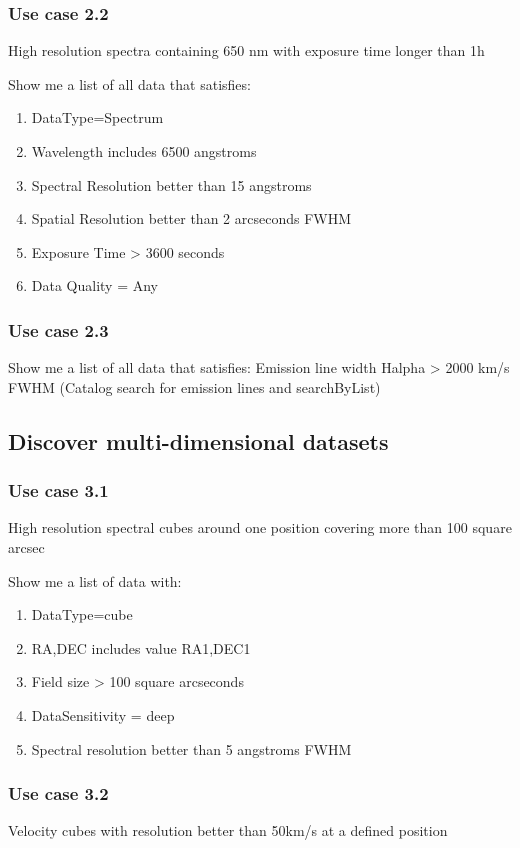 \documentclass[11pt,a4paper]{ivoa}
\begin{document}
\subsubsection{Use case 2.2}
High resolution spectra containing 650 nm with exposure time longer than 1h

Show me a list of all data that satisfies:

\begin{enumerate}
\item DataType=Spectrum
\item Wavelength includes 6500 angstroms
\item Spectral Resolution better than 15 angstroms
\item Spatial Resolution better than 2 arcseconds FWHM
\item Exposure Time {\textgreater} 3600 seconds
\item Data Quality = Any
\end{enumerate}
\subsubsection{Use case 2.3}
Show me a list of all data that satisfies: Emission line width Halpha {\textgreater} 2000 km/s FWHM (Catalog search for
emission lines and searchByList)

\subsection{Discover multi-dimensional datasets}
\subsubsection{Use case 3.1}
High resolution spectral cubes around one position covering more than 100 square arcsec

Show me a list of data with:

\begin{enumerate}
\item DataType=cube 
\item RA,DEC includes value RA1,DEC1
\item Field size {\textgreater} 100 square arcseconds
\item DataSensitivity = deep
\item Spectral resolution better than 5 angstroms FWHM
\end{enumerate}
\subsubsection{Use case 3.2}
Velocity cubes with resolution better than 50km/s at a defined position  
\end{document}
